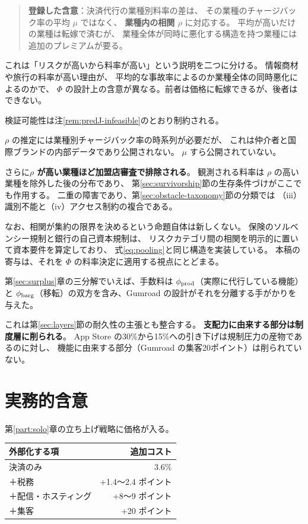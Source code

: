 \begin{quote}
\textbf{登録した含意}：決済代行の業種別料率の差は、
その業種のチャージバック率の平均 $\mu$ ではなく、
\textbf{業種内の相関 $\rho$} に対応する。
平均が高いだけの業種は転嫁で済むが、
業種全体が同時に悪化する構造を持つ業種には追加のプレミアムが要る。
\end{quote}

これは「リスクが高いから料率が高い」という説明を二つに分ける。
情報商材や旅行の料率が高い理由が、
平均的な事故率によるのか業種全体の同時悪化によるのかで、
$\Phi$ の設計上の含意が異なる。前者は価格に転嫁できるが、後者はできない。

検証可能性は注\ref{rem:predJ-infeasible}のとおり制約される。

\begin{remark}[この含意が検証できない理由]
\label{rem:predJ-infeasible}
$\rho$ の推定には業種別チャージバック率の時系列が必要だが、
これは仲介者と国際ブランドの内部データであり公開されない。
$\mu$ すら公開されていない。

さらに\textbf{$\rho$ が高い業種ほど加盟店審査で排除される}。
観測される料率は $\rho$ の高い業種を除外した後の分布であり、
第\ref{sec:survivorship}節の生存条件づけがここでも作用する。
二重の障害であり、第\ref{sec:obstacle-taxonomy}節の分類では
（iii）識別不能と（iv）アクセス制約の複合である。

なお、相関が集約の限界を決めるという命題自体は新しくない。
保険のソルベンシー規制と銀行の自己資本規制は、
リスクカテゴリ間の相関を明示的に置いて資本要件を算定しており、
式\eqref{eq:pooling}と同じ構造を実装している。
本稿の寄与は、それを $\Phi$ の料率決定に適用する視点にとどまる。
\end{remark}
第\ref{sec:surplus}章の三分解でいえば、手数料は $\phi_{\rm prod}$（実際に代行している機能）と
$\phi_{\rm barg}$（移転）の双方を含み、Gumroad の設計がそれを分離する手がかりを与えた。

これは第\ref{sec:layers}節の耐久性の主張とも整合する。
\textbf{支配力に由来する部分は制度層に削られる}。
App Store の30\%から15\%への引き下げは規制圧力の産物であるのに対し、
機能に由来する部分（Gumroad の集客20ポイント）は削られていない。

\section{実務的含意}

第\ref{part:solo}章の立ち上げ戦略に価格が入る。

\begin{center}
\begin{tabular}{@{}lr@{}}
\toprule
外部化する項 & 追加コスト \\
\midrule
決済のみ & 3.6\% \\
＋税務 & +1.4〜2.4 ポイント \\
＋配信・ホスティング & +8〜9 ポイント \\
＋集客 & +20 ポイント \\
\bottomrule
\end{tabular}
\label{tab:externalization-cost}
\end{center}


